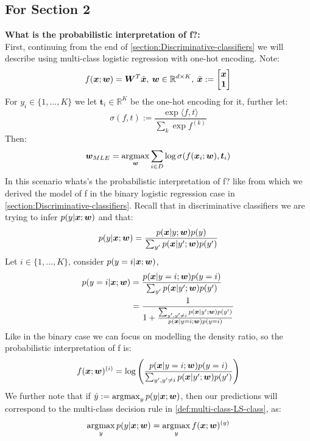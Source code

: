 \begin{appendices}
\subsection{For Section 2}
\begin{question} \label{question:prob-interp-f}
    \textbf{What is the probabilistic interpretation of f?:} \\
    First, continuing from the end of \cref{section:Discriminative-classifiers} we will describe using multi-class logistic regression with one-hot encoding. Note:
    \begin{align}
        f(\bm{x};\bm{w}) = \bm{W}^{T} \tilde{\bm{x}}, \: \bm{w} \in \mathbb{R}^{d \times K}, \: \tilde{\bm{x}} := 
        \begin{bmatrix}
            \bm{x} \\
            \bm{1}
        \end{bmatrix}
    \end{align}
    For $y_{i} \in \{1,...,K\}$ we let $\bm{t}_{i} \in \mathbb{R}^{K}$ be the one-hot encoding for it, further let:
    \begin{equation}
        \sigma(f,t) := \frac{\exp \langle f,t \rangle}{\sum_{k} \exp f^{(k)}}
    \end{equation}
    Then:
    \begin{equation}
        \bm{w}_{MLE} = \operatorname*{arg\!\max}_{\bm{w}} \sum_{i \in D} \log \sigma(f(\bm{x}_{i} ; \bm{w}), \bm{t}_{i})
    \end{equation}
    In this scenario whats's the probabilistic interpretation of f? like from which we derived the model of f in the binary logistic regression case in \cref{section:Discriminative-classifiers}. Recall that in discriminative classifiers we are trying to infer $p(y|\bm{x};\bm{w})$ and that:
    \begin{equation}
        p(y|\bm{x};\bm{w}) = \frac{p(\bm{x}|y;\bm{w})p(y)}{\sum_{y'} p(\bm{x}|y';\bm{w})p(y')}
    \end{equation}
    Let $i \in \{1,...,K\}$, consider $p(y=i|\bm{x};\bm{w})$,
    \begin{align}
        p(y=i |\bm{x};\bm{w}) &{} = \frac{p(\bm{x}|y=i;\bm{w})p(y=i)}{\sum_{y'} p(\bm{x}|y';\bm{w})p(y')} \\
        &= \frac{1}{1+ \frac{\sum_{y',y' \neq i} p(\bm{x}|y';\bm{w})p(y')}{p(\bm{x}|y=i;\bm{w})p(y=i)}}
    \end{align}
    Like in the binary case we can focus on modelling the density ratio, so the probabilistic interpretation of f is:
    \begin{equation}
        f(\bm{x};\bm{w})^{(i)} = \log \left(\frac{p(\bm{x}|y=i;\bm{w})p(y=i)}{\sum_{y',y'\neq i} p(\bm{x}|y';\bm{w}) p(y')} \right)
    \end{equation}
    We further note that if $\hat{y} := \operatorname*{arg\!\max}_{y} p(y|\bm{x};\bm{w})$, then our predictions will correspond to the multi-class decision rule in \cref{def:multi-class-LS-class}, as:
    \begin{equation}
        \operatorname*{arg\!\max}_{y} p(y|\bm{x};\bm{w}) = \operatorname*{arg\!\max}_{y} f(\bm{x};\bm{w})^{(y)}
    \end{equation}
\end{question}

\end{appendices}